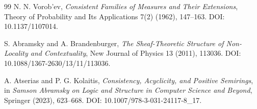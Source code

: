 \documentclass[11pt]{article}
\begin{document}
\begin{thebibliography}{99}
N. N. Vorob'ev,
\emph{Consistent Families of Measures and Their Extensions},
Theory of Probability and Its Applications 7(2) (1962), 147--163.
DOI: 10.1137/1107014.

S. Abramsky and A. Brandenburger,
\emph{The Sheaf-Theoretic Structure of Non-Locality and Contextuality},
New Journal of Physics 13 (2011), 113036.
DOI: 10.1088/1367-2630/13/11/113036.

A. Atserias and P. G. Kolaitis,
\emph{Consistency, Acyclicity, and Positive Semirings},
in \emph{Samson Abramsky on Logic and Structure in Computer Science and Beyond},
Springer (2023), 623--668.
DOI: 10.1007/978-3-031-24117-8\_17.

\end{thebibliography}
\end{document}
